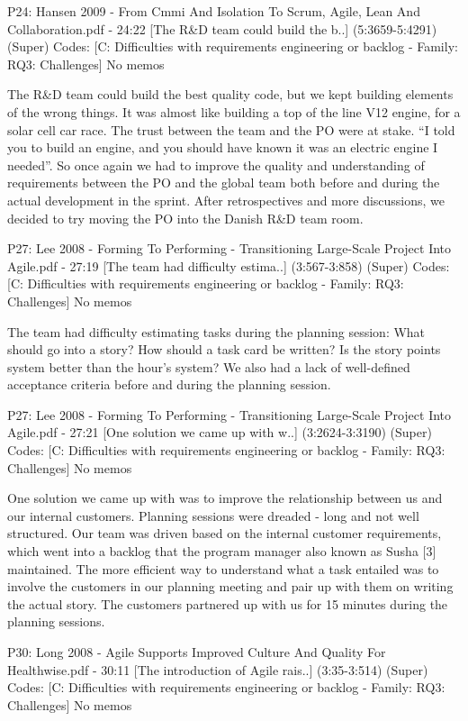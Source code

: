\documentclass[preprint,authoryear,12pt]{elsarticle}
\begin{document}
P24: Hansen 2009 - From Cmmi And Isolation To Scrum, Agile, Lean And Collaboration.pdf - 24:22 [The R&D team could build the b..]  (5:3659-5:4291)   (Super)
Codes:	[C: Difficulties with requirements engineering or backlog - Family: RQ3: Challenges] 
No memos

The R&D team could build the best quality code, 
but we kept building elements of the wrong things. It 
was almost like building a top of the line V12 engine, 
for a solar cell car race. The trust between the team and 
the PO were at stake. “I told you to build an engine, 
and you should have known it was an electric engine I 
needed”. So once again we had to improve the quality 
and understanding of requirements between the PO and 
the global team both before and during the actual 
development in the sprint. After retrospectives and 
more discussions, we decided to try moving the PO 
into the Danish R&D team room.


P27: Lee 2008 - Forming To Performing - Transitioning Large-Scale Project Into Agile.pdf - 27:19 [The team had difficulty estima..]  (3:567-3:858)   (Super)
Codes:	[C: Difficulties with requirements engineering or backlog - Family: RQ3: Challenges] 
No memos

The team had difficulty
estimating tasks during the planning session: What
should go into a story? How should a task card be
written? Is the story points system better than the
hour’s system? We also had a lack of well-defined
acceptance criteria before and during the planning
session.


P27: Lee 2008 - Forming To Performing - Transitioning Large-Scale Project Into Agile.pdf - 27:21 [One solution we came up with w..]  (3:2624-3:3190)   (Super)
Codes:	[C: Difficulties with requirements engineering or backlog - Family: RQ3: Challenges] 
No memos

One solution we came up with was to improve the
relationship between us and our internal customers.
Planning sessions were dreaded - long and not well
structured. Our team was driven based on the internal
customer requirements, which went into a backlog
that the program manager also known as Susha
[3]
maintained. The more efficient way to understand
what a task entailed was to involve the customers in
our planning meeting and pair up with them on
writing the actual story. The customers partnered up
with us for 15 minutes during the planning sessions.


P30: Long 2008 - Agile Supports Improved Culture And Quality For Healthwise.pdf - 30:11 [The introduction of Agile rais..]  (3:35-3:514)   (Super)
Codes:	[C: Difficulties with requirements engineering or backlog - Family: RQ3: Challenges] 
No memos
\end{document}
